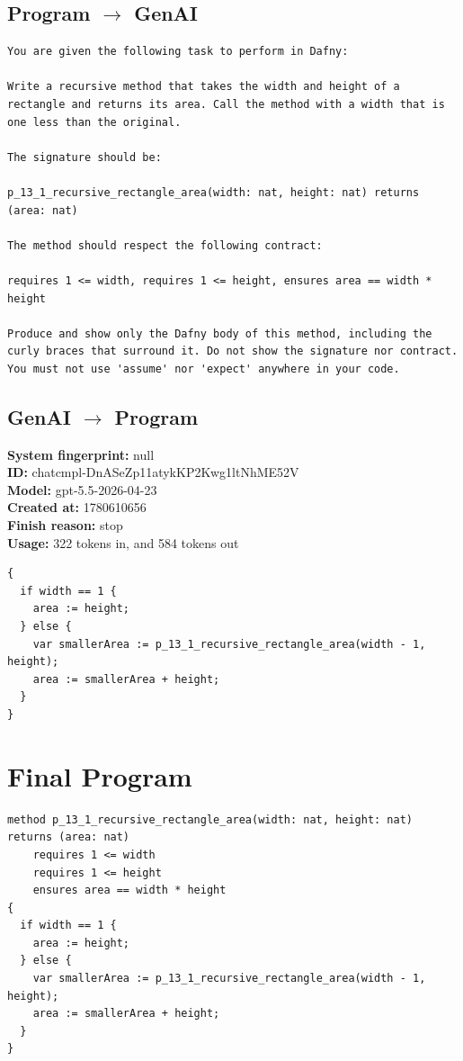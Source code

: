 \documentclass{article}
\begin{document}
\subsection*{Program $\rightarrow$ GenAI}
\begin{lstlisting}
You are given the following task to perform in Dafny:

Write a recursive method that takes the width and height of a rectangle and returns its area. Call the method with a width that is one less than the original.

The signature should be:

p_13_1_recursive_rectangle_area(width: nat, height: nat) returns (area: nat)

The method should respect the following contract:

requires 1 <= width, requires 1 <= height, ensures area == width * height

Produce and show only the Dafny body of this method, including the curly braces that surround it. Do not show the signature nor contract. You must not use 'assume' nor 'expect' anywhere in your code.
\end{lstlisting}
\subsection*{GenAI $\rightarrow$ Program}
\textbf{System fingerprint: }null
\\\textbf{ID: }chatcmpl-DnASeZp11atykKP2Kwg1ltNhME52V
\\\textbf{Model: }gpt-5.5-2026-04-23
\\\textbf{Created at: }1780610656
\\\textbf{Finish reason: }stop
\\\textbf{Usage: }322 tokens in, and 584 tokens out
\begin{lstlisting}
{
  if width == 1 {
    area := height;
  } else {
    var smallerArea := p_13_1_recursive_rectangle_area(width - 1, height);
    area := smallerArea + height;
  }
}
\end{lstlisting}
\section*{Final Program}
\begin{lstlisting}
method p_13_1_recursive_rectangle_area(width: nat, height: nat) returns (area: nat)
	requires 1 <= width
	requires 1 <= height
	ensures area == width * height
{
  if width == 1 {
    area := height;
  } else {
    var smallerArea := p_13_1_recursive_rectangle_area(width - 1, height);
    area := smallerArea + height;
  }
}
\end{lstlisting}
\end{document}
